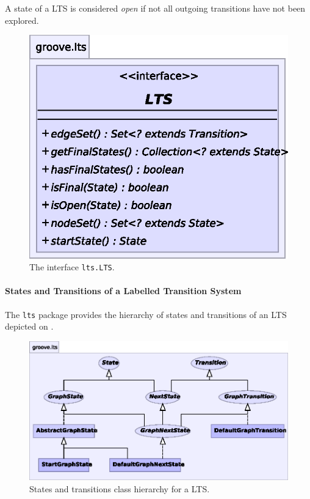 \noindent
A state of a LTS is considered {\em open} if not all outgoing transitions have
not been explored.

\begin{figure}[ht]
  \centering
  \includegraphics[scale=0.8]{fig/LTS}
  \caption{The interface {\tt lts.LTS}.}
\end{figure}


\paragraph{States and Transitions of a Labelled Transition System}

The {\tt lts} package provides the hierarchy of states and
transitions of an LTS depicted on .

\begin{figure}[ht]
  \centering
  \includegraphics{fig/states-and-transitions}
  \caption{States and transitions class hierarchy for a LTS.}
\end{figure}

